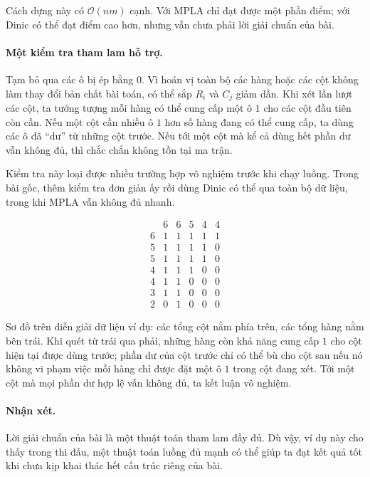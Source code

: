 \documentclass[11pt]{article}
\newcommand{\Oh}{\mathcal{O}}
\begin{document}
Cách dựng này có \(\Oh(nm)\) cạnh. Với MPLA chỉ đạt được một phần điểm; với
Dinic có thể đạt điểm cao hơn, nhưng vẫn chưa phải lời giải chuẩn của bài.

\paragraph{Một kiểm tra tham lam hỗ trợ.}
Tạm bỏ qua các ô bị ép bằng \(0\). Vì hoán vị toàn bộ các hàng hoặc các cột
không làm thay đổi bản chất bài toán, có thể sắp \(R_i\) và \(C_j\) giảm dần.
Khi xét lần lượt các cột, ta tưởng tượng mỗi hàng có thể cung cấp một ô \(1\)
cho các cột đầu tiên còn cần. Nếu một cột cần nhiều ô \(1\) hơn số hàng đang
có thể cung cấp, ta dùng các ô đã ``dư'' từ những cột trước. Nếu tới một cột
mà kể cả dùng hết phần dư vẫn không đủ, thì chắc chắn không tồn tại ma trận.

Kiểm tra này loại được nhiều trường hợp vô nghiệm trước khi chạy luồng. Trong
bài gốc, thêm kiểm tra đơn giản ấy rồi dùng Dinic có thể qua toàn bộ dữ liệu,
trong khi MPLA vẫn không đủ nhanh.

\[
\begin{array}{c|ccccc}
 & 6 & 6 & 5 & 4 & 4\\
\hline
6 & 1 & 1 & 1 & 1 & 1\\
5 & 1 & 1 & 1 & 1 & 0\\
5 & 1 & 1 & 1 & 1 & 0\\
4 & 1 & 1 & 1 & 0 & 0\\
4 & 1 & 1 & 0 & 0 & 0\\
3 & 1 & 1 & 0 & 0 & 0\\
2 & 0 & 1 & 0 & 0 & 0
\end{array}
\]

Sơ đồ trên diễn giải dữ liệu ví dụ: các tổng cột nằm phía trên, các tổng
hàng nằm bên trái. Khi quét từ trái qua phải, những hàng còn khả năng cung cấp
\(1\) cho cột hiện tại được dùng trước; phần dư của cột trước chỉ có thể bù cho
cột sau nếu nó không vi phạm việc mỗi hàng chỉ được đặt một ô \(1\) trong cột
đang xét. Tới một cột mà mọi phần dư hợp lệ vẫn không đủ, ta kết luận vô nghiệm.

\paragraph{Nhận xét.}
Lời giải chuẩn của bài là một thuật toán tham lam đầy đủ. Dù vậy, ví dụ này
cho thấy trong thi đấu, một thuật toán luồng đủ mạnh có thể giúp ta đạt kết
quả tốt khi chưa kịp khai thác hết cấu trúc riêng của bài.
\end{document}
